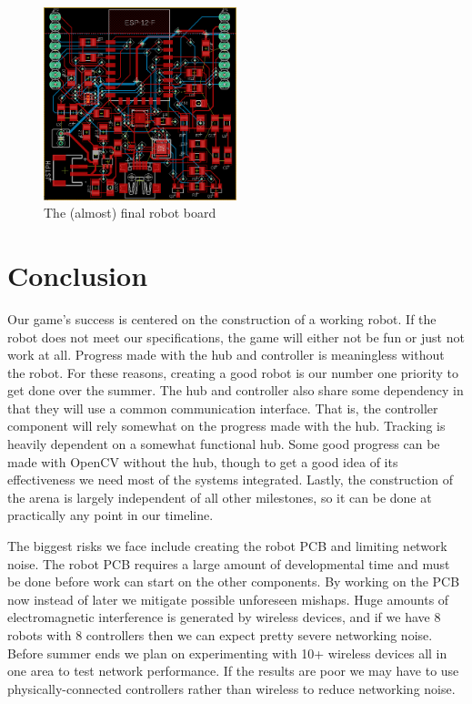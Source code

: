 \documentclass[11pt]{ieeeconf}
\begin{document}
\begin{figure}[h]
\centering
\captionsetup{justification=centering}
\includegraphics[width=0.5\textwidth]{images/RobotBoard.png}
\caption{The (almost) final robot board}
\label{roboboard}
\end{figure}

\section{Conclusion}
Our game’s success is centered on the construction of a working robot. If the robot does not meet our specifications, the game will either not be fun or just not work at all. Progress made with the hub and controller is meaningless without the robot. For these reasons, creating a good robot is our number one priority to get done over the summer. The hub and controller also share some dependency in that they will use a common communication interface. That is, the controller component will rely somewhat on the progress made with the hub. Tracking is heavily dependent on a somewhat functional hub. Some good progress can be made with OpenCV without the hub, though to get a good idea of its effectiveness we need most of the systems integrated. Lastly, the construction of the arena is largely independent of all other milestones, so it can be done at practically any point in our timeline.

The biggest risks we face include creating the robot PCB and limiting network noise. The robot PCB requires a large amount of developmental time and must be done before work can start on the other components. By working on the PCB now instead of later we mitigate possible unforeseen mishaps. Huge amounts of electromagnetic interference is generated by wireless devices, and if we have 8 robots with 8 controllers then we can expect pretty severe networking noise. Before summer ends we plan on experimenting with 10+ wireless devices all in one area to test network performance. If the results are poor we may have to use physically-connected controllers rather than wireless to reduce networking noise. 
\end{document}

